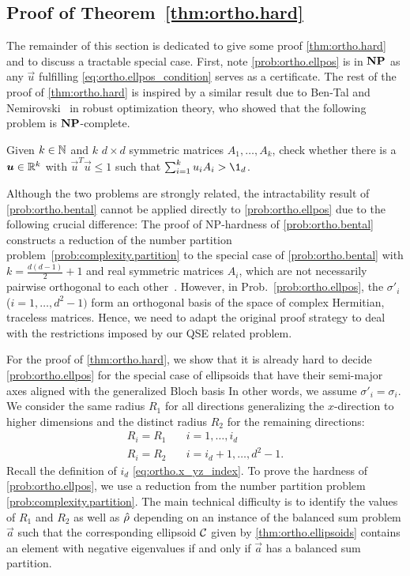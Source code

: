 \subsection{Proof of Theorem~\ref{thm:ortho.hard}}
\label{sub:error.ellpos}

The remainder of this section is dedicated to give some proof \cref{thm:ortho.hard} and to discuss a tractable special case.
First, note \cref{prob:ortho.ellpos} is in $\mathbf{NP}$ as any $\vec u$ fulfilling \cref{eq:ortho.ellpos_condition} serves as a certificate.
The rest of the proof of \cref{thm:ortho.hard} is inspired by a similar result due to Ben-Tal and Nemirovski~\cite{Tal_1998_Robust} in robust optimization theory, who showed that the following problem is $\mathbf{NP}$-complete.
\begin{problem}
  \label{prob:ortho.bental}
  Given $k \in {\mathbb{N}}$ and $k$ $d\times d$ symmetric matrices $A_{1},\ldots,A_{k}$, check whether there is a ${\boldsymbol{u}} \in {\mathbb{R}}^k$ with $\vec{u}^{T}\vec{u} \leq 1$ such that $\sum_{i=1}^{k}u_{i}A_{i} > \1_{d}$.
\end{problem}
Although the two problems are strongly related, the intractability result of \cref{prob:ortho.bental} cannot be applied directly to \cref{prob:ortho.ellpos} due to the following crucial difference:
The proof of NP-hardness of \cref{prob:ortho.bental} constructs a reduction of the number partition problem~\ref{prob:complexity.partition} to the special case of \cref{prob:ortho.bental} with $k=\frac{d(d-1)}{2} + 1$ and real symmetric matrices $A_i$, which are not necessarily pairwise orthogonal to each other~\cite[Sec.~3.4.1]{Tal_1998_Robust}.
However, in Prob.~\ref{prob:ortho.ellpos}, the $\sigma'_i$ ($i=1,\ldots,d^2 - 1)$ form an orthogonal basis of the space of complex Hermitian, traceless matrices.
Hence, we need to adapt the original proof strategy to deal with the restrictions imposed by our QSE related problem.

For the proof of \cref{thm:ortho.hard}, we show that it is already hard to decide \cref{prob:ortho.ellpos} for the special case of ellipsoids that have their semi-major axes aligned with the generalized Bloch basis
In other words, we assume $\sigma'_i = \sigma_i$.
We consider the same radius $R_{1}$ for all directions generalizing the $x$-direction to higher dimensions and the distinct radius $R_{2}$ for the remaining directions:
\[
  \label{eq:ortho.subclass}
  \begin{split}
    R_{i}=R_{1} &\quad i=1,\ldots,i_{d}\\
    R_{i}=R_{2} &\quad i=i_{d}+1,\ldots,d^{2}-1.
  \end{split}
\]
Recall the definition of $i_d$ \cref{eq:ortho.x_yz_index}.
To prove the hardness of \cref{prob:ortho.ellpos}, we use a reduction from the number partition problem \ref{prob:complexity.partition}.
The main technical difficulty is to identify the values of $R_1$ and $R_2$ as well as $\hat{\rho}$ depending on an instance of the balanced sum problem $\vec a$ such that the corresponding ellipsoid $\mathcal{C}$ given by \cref{thm:ortho.ellipsoids} contains an element with negative eigenvalues if and only if $\vec a$ has a balanced sum partition.\\




